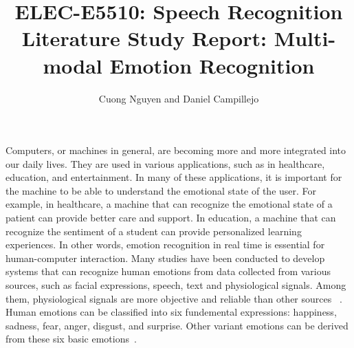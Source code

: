 \documentclass{article}
\title{ELEC-E5510: Speech Recognition\\
    \large Literature Study Report: Multi-modal Emotion Recognition}
\author{Cuong Nguyen and Daniel Campillejo}
\begin{document}
\maketitle


% 
% 

Computers, or machines in general, are becoming more and more integrated into our daily lives.
They are used in various applications, such as in healthcare, education, and entertainment.
In many of these applications, it is important for the machine to be able to understand the
emotional state of the user. For example, in healthcare, a machine that can recognize the
emotional state of a patient can provide better care and support. In education, a machine
that can recognize the sentiment of a student can provide personalized learning experiences.
In other words, emotion recognition in real time is essential for human-computer interaction.
Many studies have been conducted to develop systems that can recognize human emotions from
data collected from various sources, such as facial expressions, speech, text and physiological
signals. Among them, physiological signals are more objective and reliable than other sources
~\cite{unimodal-to-multimodal}.
Human emotions can be classified into six fundemental expressions: happiness, sadness,
fear, anger, disgust, and surprise. Other variant emotions can be derived from these six
basic emotions~\cite{basic-emotions}.
\end{document}
